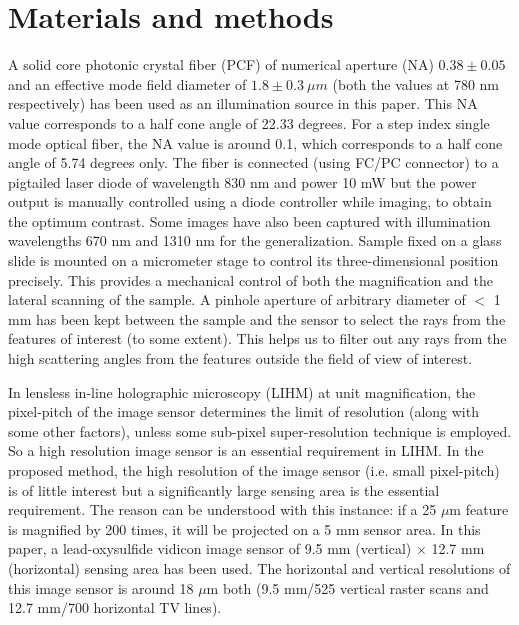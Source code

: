 \documentclass[journal]{IEEEtran}
\begin{document}
\section{Materials and methods}
A solid core photonic crystal fiber (PCF) of numerical aperture (NA) $0.38 \pm 0.05$ and an effective mode field diameter of $1.8 \pm 0.3 \ \mu m$ (both the values at 780 nm respectively) has been used as an illumination source in this paper. This NA value corresponds to a half cone angle of 22.33 degrees. For a step index single mode optical fiber, the NA value is around 0.1, which corresponds to a half cone angle of 5.74 degrees only. The fiber is connected (using FC/PC connector) to a pigtailed laser diode of wavelength 830 nm and power 10 mW but the power output is manually controlled using a diode controller while imaging, to obtain the optimum contrast. Some images have also been captured with illumination wavelengths 670 nm and 1310 nm for the generalization. Sample fixed on a glass slide is mounted on a micrometer stage to control its three-dimensional position precisely. This provides a mechanical control of both the magnification and the lateral scanning of the sample. A pinhole aperture of arbitrary diameter of $<$ 1 mm has been kept between the sample and the sensor to select the rays from the features of interest (to some extent). This helps us to filter out any rays from the high scattering angles from the features outside the field of view of interest.



In lensless in-line holographic microscopy (LIHM) at unit magnification, the pixel-pitch of the image sensor determines the limit of resolution (along with some other factors), unless some sub-pixel super-resolution technique is employed. So a high resolution image sensor is an essential requirement in LIHM. In the proposed method, the high resolution of the image sensor (i.e. small pixel-pitch) is of little interest but a significantly large sensing area is the essential requirement. The reason can be understood with this instance: if a 25 $\mu$m feature is magnified by 200 times, it will be projected on a 5 mm sensor area. In this paper, a lead-oxysulfide vidicon image sensor of 9.5 mm (vertical) $\times$ 12.7 mm (horizontal) sensing area has been used. The horizontal and vertical resolutions of this image sensor is around 18 $\mu$m both (9.5 mm/525 vertical raster scans and  12.7 mm/700 horizontal TV lines). 
\end{document}
